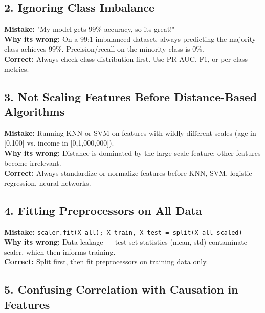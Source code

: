 \documentclass[11pt]{article}
\begin{document}
\subsection{2. Ignoring Class Imbalance}\label{2-ignoring-class-imbalance}

\textbf{Mistake:} "My model gets 99\% accuracy, so it\textquotesingle s great!"\\
\textbf{Why it\textquotesingle s wrong:} On a 99:1 imbalanced dataset, always predicting the majority class achieves 99\%. Precision/recall on the minority class is 0\%.\\
\textbf{Correct:} Always check class distribution first. Use PR-AUC, F1, or per-class metrics.

\subsection{3. Not Scaling Features Before Distance-Based Algorithms}\label{3-not-scaling-features-before-distance-based-algorithms}

\textbf{Mistake:} Running KNN or SVM on features with wildly different scales (age in {[}0,100{]} vs. income in {[}0,1,000,000{]}).\\
\textbf{Why it\textquotesingle s wrong:} Distance is dominated by the large-scale feature; other features become irrelevant.\\
\textbf{Correct:} Always standardize or normalize features before KNN, SVM, logistic regression, neural networks.

\subsection{4. Fitting Preprocessors on All Data}\label{4-fitting-preprocessors-on-all-data}

\textbf{Mistake:} \texttt{scaler.fit(X\_all);\ X\_train,\ X\_test\ =\ split(X\_all\_scaled)}\\
\textbf{Why it\textquotesingle s wrong:} Data leakage --- test set statistics (mean, std) contaminate scaler, which then informs training.\\
\textbf{Correct:} Split first, then fit preprocessors on training data only.

\subsection{5. Confusing Correlation with Causation in Features}\label{5-confusing-correlation-with-causation-in-features}
\end{document}

